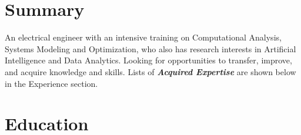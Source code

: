 \documentclass[11pt,letterpaper,sans]{moderncv}
\begin{document}
\vspace{-8ex}
\makecvtitle
\vspace{-8ex}
\section{Summary}
\vspace{-1ex}



An electrical engineer with an intensive training on Computational Analysis, Systems Modeling and Optimization, who also has research interests in Artificial Intelligence and Data Analytics. Looking for opportunities to transfer, improve, and acquire knowledge and skills.
Lists of \textbf{\emph{Acquired Expertise}} are shown below in the Experience section.


\vspace{-2ex}
\section{Education}
\end{document}
